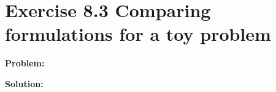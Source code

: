 \section{Exercise 8.3 Comparing formulations for a toy problem}
\textbf{Problem:} 

\textbf{Solution:} 